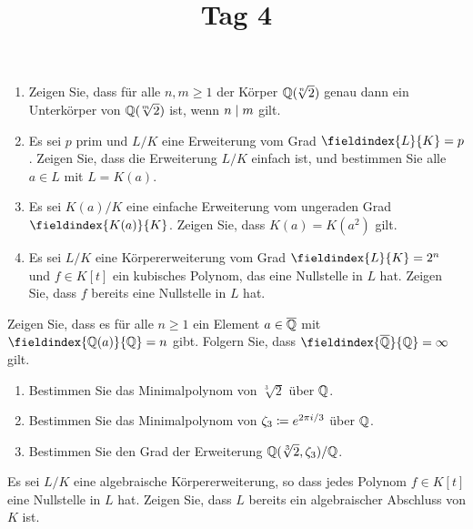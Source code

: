 \documentclass[a4paper, 10pt]{scrartcl}
\title{Tag 4}
\author{}
\date{}
\begin{document}
\begin{question}
  \begin{enumerate}
    \item
      Zeigen Sie, dass für alle $n, m \geq 1$ der Körper $\mathbb{Q}(\!\sqrt[n]{2})$ genau dann ein Unterkörper von $\mathbb{Q}(\!\sqrt[m]{2})$ ist, wenn $n \mathrel{|} m$ gilt.
    \item 
      Es sei $p$ prim und $L/K$ eine Erweiterung vom Grad $\fieldindex{L}{K} = p$.
      Zeigen Sie, dass die Erweiterung $L/K$ einfach ist, und bestimmen Sie alle $a \in L$ mit $L = K(a)$.
    \item
      Es sei $K(a)/K$ eine einfache Erweiterung vom ungeraden Grad $\fieldindex{K(a)}{K}$.
      Zeigen Sie, dass $K(a) = K(a^2)$ gilt.
    \item
      Es sei $L/K$ eine Körpererweiterung vom Grad $\fieldindex{L}{K} = 2^n$ und $f \in K[t]$ ein kubisches Polynom, das eine Nullstelle in $L$ hat.
      Zeigen Sie, dass $f$ bereits eine Nullstelle in $L$ hat.
  \end{enumerate}


\end{question}

\begin{question}
  Zeigen Sie, dass es für alle $n \geq 1$ ein Element $a \in \overline{\mathbb{Q}}$ mit $\fieldindex{\Rational(a)}{\Rational} = n$ gibt.
  Folgern Sie, dass $\fieldindex{\closure{\Rational}}{\Rational} = \infty$ gilt.
\end{question}

\begin{question}
  \begin{enumerate}
    \item
      Bestimmen Sie das Minimalpolynom von $\sqrt[3]{2}$ über $\mathbb{Q}$.
    \item
      Bestimmen Sie das Minimalpolynom von  $\zeta_3 \coloneqq e^{2 \pi i/3}$ über $\mathbb{Q}$.
    \item
      Bestimmen Sie den Grad der Erweiterung $\mathbb{Q}(\sqrt[3]{2}, \zeta_3)/\mathbb{Q}$.
  \end{enumerate}
\end{question}



\begin{question}
  Es sei $L/K$ eine algebraische Körpererweiterung, so dass jedes Polynom $f \in K[t]$ eine Nullstelle in $L$ hat.
  Zeigen Sie, dass $L$ bereits ein algebraischer Abschluss von $K$ ist.
\end{question}
\end{document}
